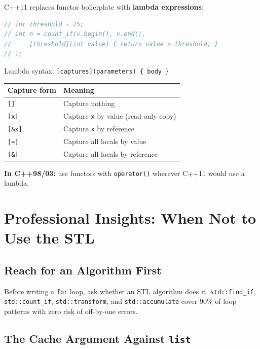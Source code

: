 C++11 replaces functor boilerplate with \textbf{lambda expressions}:

\begin{lstlisting}[language=C++, caption={C++11 lambda (forward reference, not C++98)}]
// int threshold = 25;
// int n = count_if(v.begin(), v.end(),
//     [threshold](int value) { return value > threshold; }
// );
\end{lstlisting}

Lambda syntax: \texttt{[captures](parameters) \{ body \}}

\begin{center}
\begin{tabular}{|l|l|}
\hline
\textbf{Capture form} & \textbf{Meaning} \\
\hline
\texttt{[]} & Capture nothing \\
\texttt{[x]} & Capture \texttt{x} by value (read-only copy) \\
\texttt{[\&x]} & Capture \texttt{x} by reference \\
\texttt{[=]} & Capture all locals by value \\
\texttt{[\&]} & Capture all locals by reference \\
\hline
\end{tabular}
\end{center}

\textbf{In C++98/03:} use functors with \texttt{operator()} wherever C++11 would use a lambda.

\section{Professional Insights: When Not to Use the STL}
\label{sec:stl-pro-insights-ch8}

\subsection{Reach for an Algorithm First}

Before writing a \texttt{for} loop, ask whether an STL algorithm does it. \texttt{std::find\_if}, \texttt{std::count\_if}, \texttt{std::transform}, and \texttt{std::accumulate} cover 90\% of loop patterns with zero risk of off-by-one errors.

\subsection{The Cache Argument Against \texttt{list}}

